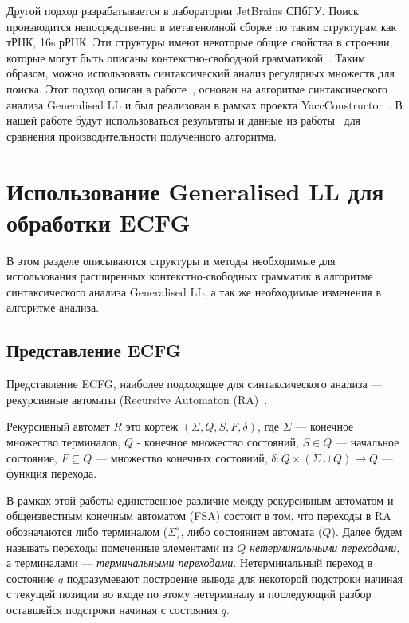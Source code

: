 Другой подход разрабатывается в лаборатории JetBrains СПбГУ.
Поиск производится непосредственно в метагеномной сборке по таким структурам как тРНК, 16s рРНК.
Эти структуры имеют некоторые общие свойства в строении, которые могут быть описаны
контекстно-свободной грамматикой~\cite{Anderson2013}.
Таким образом, можно использовать синтаксический анализ регулярных множеств для поиска.
Этот подход описан в работе~\cite{ragozina}, основан на алгоритме синтаксического анализа Generalised LL и 
был реализован в рамках проекта YaccConstructor~\cite{YaccConstructor}. В нашей работе 
будут использоваться результаты и данные из работы~\cite{ragozina} для сравнения производительности полученного алгоритма.

\section{Использование Generalised LL для обработки ECFG}

В этом разделе описываются структуры и методы необходимые для использования расширенных контекстно-свободных грамматик 
в алгоритме синтаксического анализа Generalised LL, а так же необходимые изменения в алгоритме анализа.

\subsection{Представление ECFG}

Представление ECFG, наиболее подходящее для синтаксического анализа --- рекурсивные автоматы
(Recursive Automaton (RA)~\cite{tellier2006learning}.
\begin{mydef}
	Рекурсивный автомат $R$ это кортеж $(\Sigma, Q, S, F, \delta)$, где $\Sigma$
	--- конечное множество терминалов, $Q$ - конечное множество состояний, $S \in Q$ 
	--- начальное состояние, $F \subseteq Q$ --- множество конечных состояний,
	$\delta : Q \times (\Sigma \cup Q) \to Q$ --- функция перехода.
\end{mydef}
В рамках этой работы единственное различие между рекурсивным автоматом и общеизвестным
конечным автоматом (FSA) состоит в том, что переходы в RA обозначаются либо терминалом ($\Sigma$),
либо состоянием автомата ($Q$). Далее будем называть переходы помеченные элементами из
$Q$ \textit{нетерминальными переходами}, а терминалами --- \textit{терминальными переходами}.
Нетерминальный переход в состояние $q$ подразумевают построение вывода для некоторой подстроки начиная с текущей позиции во входе
по этому нетерминалу и последующий разбор оставшейся подстроки начиная с состояния $q$.

